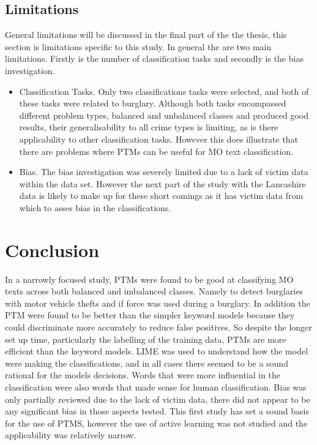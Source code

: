 \subsection{Limitations} General limitations will be discussed in the final part of the the thesis, this section is limitations specific to this study. In general the are two main limitations. Firstly is the number of classification tasks and secondly is the bias investigation.

\begin{itemize}
    \item Classification Tasks. Only two classifications tasks were selected, and both of these tasks were related to burglary. Although both tasks encompassed different problem types, balanced and unbalanced classes and produced good results, their generalisability to all crime types is limiting, as is there applicability to other classification tasks. However this does illustrate that there are problems where PTMs can be useful for MO text classification.
    
    \item Bias. The bias investigation was severely limited due to a lack of victim data within the data set. However the next part of the study with the Lancashire data is likely to make up for these short comings as it has victim data from which to asses bias in the classifications. 
    
\end{itemize}

\section{Conclusion} In a narrowly focused study, PTMs were found to be good at classifying MO texts across both balanced and imbalanced classes. Namely to detect burglaries with motor vehicle thefts and if force was used during a burglary. In addition the PTM were found to be better than the simpler keyword models because they could discriminate more accurately to reduce false positives. So despite the longer set up time, particularly the labelling of the training data, PTMs are more efficient than the keyword models. LIME was used to understand how the model were making the classifications, and in all cases there seemed to be a sound rational for the models decisions. Words that were more influential in the classification were also words that made sense for human classification. Bias was only partially reviewed due to the lack of victim data, there did not appear to be any significant bias in those aspects tested. This first study has set a sound basis for the use of PTMS, however the use of active learning was not studied and the applicability was relatively narrow.

